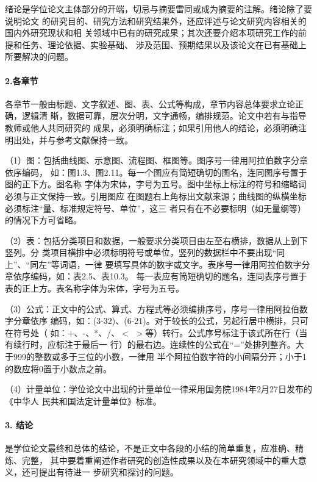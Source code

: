 绪论是学位论文主体部分的开端，切忌与摘要雷同或成为摘要的注解。绪论除了要说明论文
的研究目的、研究方法和研究结果外，还应评述与论文研究内容相关的国内外研究现状和相
关领域中已有的研究成果；其次还要介绍本项研究工作的前提和任务、理论依据、实验基础、
涉及范围、预期结果以及该论文在已有基础上所要解决的问题。

\paragraph{2.各章节}

各章节一般由标题、文字叙述、图、表、公式等构成，章节内容总体要求立论正确，逻辑清
晰，数据可靠，层次分明，文字通畅，编排规范。论文中若有与指导教师或他人共同研究的
成果，必须明确标注；如果引用他人的结论，必须明确注明出处，并与参考文献保持一致。

（1）图：包括曲线图、示意图、流程图、框图等。图序号一律用阿拉伯数字分章依序编码，
如：图1.3、图2.11。每一个图应有简短确切的图名，连同图序号置于图的正下方。图名称
字体为宋体，字号为五号。图中坐标上标注的符号和缩略词必须与正文保持一致。引用图应
在图题右上角标出文献来源；曲线图的纵横坐标必须标注“量、标准规定符号、单位”，这三
者只有在不必要标明（如无量纲等）的情况下方可省略。

（2）表：包括分类项目和数据，一般要求分类项目由左至右横排，数据从上到下竖列。分
类项目横排中必须标明符号或单位，竖列的数据栏中不要出现“同上”、“同左”等词语，一律
要填写具体的数字或文字。表序号一律用阿拉伯数字分章依序编码，如：表2.5、表10.3。
每一表应有简短确切的题名，连同表序号置于表的正上方。表名称字体为宋体，字号为五号。

（3）公式：正文中的公式、算式、方程式等必须编排序号，序号一律用阿拉伯数字分章依序
编码，如：(3-32)、(6-21)。对于较长的公式，另起行居中横排，只可在符号处（
如：+、-、*、/、$<$ $>$等）转行。公式序号标注于该式所在行（当有续行时，应标注于最后一
行）的最右边。连续性的公式在“=”处排列整齐。大于999的整数或多于三位的小数，一律用
半个阿拉伯数字符的小间隔分开；小于1的数应将0置于小数点之前。

（4）计量单位：学位论文中出现的计量单位一律采用国务院1984年2月27日发布的《中华人
民共和国法定计量单位》标准。

\paragraph{3. 结论}
是学位论文最终和总体的结论，不是正文中各段的小结的简单重复，应准确、精炼、完整，
其中要着重阐述作者研究的创造性成果以及在本研究领域中的重大意义，还可提出有待进一
步研究和探讨的问题。

